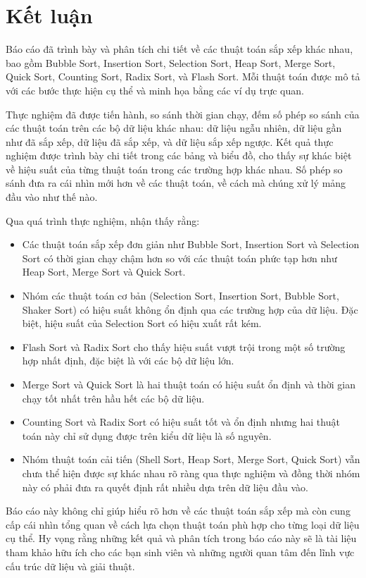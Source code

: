 \section{Kết luận}

Báo cáo đã trình bày và phân tích chi tiết về các thuật toán sắp xếp khác nhau, bao gồm Bubble Sort, Insertion Sort, Selection Sort, Heap Sort, Merge Sort, Quick Sort, Counting Sort, Radix Sort, và Flash Sort. Mỗi thuật toán được mô tả với các bước thực hiện cụ thể và minh họa bằng các ví dụ trực quan.

Thực nghiệm đã được tiến hành, so sánh thời gian chạy, đếm số phép so sánh của các thuật toán trên các bộ dữ liệu khác nhau: dữ liệu ngẫu nhiên, dữ liệu gần như đã sắp xếp, dữ liệu đã sắp xếp, và dữ liệu sắp xếp ngược. Kết quả thực nghiệm được trình bày chi tiết trong các bảng và biểu đồ, cho thấy sự khác biệt về hiệu suất của từng thuật toán trong các trường hợp khác nhau. Số phép so sánh đưa ra cái nhìn mới hơn về các thuật toán, về cách mà chúng xử lý mảng đầu vào như thế nào.

Qua quá trình thực nghiệm, nhận thấy rằng:
\begin{itemize}
    \item Các thuật toán sắp xếp đơn giản như Bubble Sort, Insertion Sort và Selection Sort có thời gian chạy chậm hơn so với các thuật toán phức tạp hơn như Heap Sort, Merge Sort và Quick Sort.
    \item Nhóm các thuật toán cơ bản (Selection Sort, Insertion Sort, Bubble Sort, Shaker Sort) có hiệu suất không ổn định qua các trường hợp của dữ liệu. Đặc biệt, hiệu suất của Selection Sort có hiệu xuất rất kém.
    \item Flash Sort và Radix Sort cho thấy hiệu suất vượt trội trong một số trường hợp nhất định, đặc biệt là với các bộ dữ liệu lớn.
    \item Merge Sort và Quick Sort là hai thuật toán có hiệu suất ổn định và thời gian chạy tốt nhất trên hầu hết các bộ dữ liệu.
    \item Counting Sort và Radix Sort có hiệu suất tốt và ổn định nhưng hai thuật toán này chỉ sử dụng được trên kiểu dữ liệu là số nguyên.
    \item Nhóm thuật toán cải tiến (Shell Sort, Heap Sort, Merge Sort, Quick Sort) vẫn chưa thể hiện được sự khác nhau rõ ràng qua thực nghiệm và đồng thời nhóm này có phải đưa ra quyết định rất nhiều dựa trên dữ liệu đầu vào.
\end{itemize}

Báo cáo này không chỉ giúp hiểu rõ hơn về các thuật toán sắp xếp mà còn cung cấp cái nhìn tổng quan về cách lựa chọn thuật toán phù hợp cho từng loại dữ liệu cụ thể. Hy vọng rằng những kết quả và phân tích trong báo cáo này sẽ là tài liệu tham khảo hữu ích cho các bạn sinh viên và những người quan tâm đến lĩnh vực cấu trúc dữ liệu và giải thuật.
